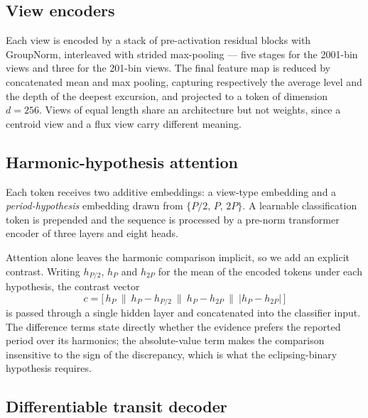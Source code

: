 \documentclass[preprint,12pt,authoryear]{elsarticle}
\begin{document}
\subsection{View encoders}

Each view is encoded by a stack of pre-activation residual blocks with
GroupNorm, interleaved with strided max-pooling --- five stages for the 2001-bin
views and three for the 201-bin views. The final feature map is reduced by
concatenated mean and max pooling, capturing respectively the average level and
the depth of the deepest excursion, and projected to a token of dimension
$d=256$. Views of equal length share an architecture but not weights, since a
centroid view and a flux view carry different meaning.

\subsection{Harmonic-hypothesis attention}
\label{sec:harmonic}

Each token receives two additive embeddings: a view-type embedding and a
\emph{period-hypothesis} embedding drawn from $\{P/2,\,P,\,2P\}$. A learnable
classification token is prepended and the sequence is processed by a
pre-norm transformer encoder \citep{Vaswani2017} of three layers and eight
heads.

Attention alone leaves the harmonic comparison implicit, so we add an explicit
contrast. Writing $h_{P/2}$, $h_{P}$ and $h_{2P}$ for the mean of the encoded
tokens under each hypothesis, the contrast vector
\begin{equation}
c = \big[\,h_{P}\ \|\ h_{P}-h_{P/2}\ \|\ h_{P}-h_{2P}\ \|\ |h_{P}-h_{2P}|\,\big]
\label{eq:contrast}
\end{equation}
is passed through a single hidden layer and concatenated into the classifier
input. The difference terms state directly whether the evidence prefers the
reported period over its harmonics; the absolute-value term makes the comparison
insensitive to the sign of the discrepancy, which is what the eclipsing-binary
hypothesis requires.

\subsection{Differentiable transit decoder}
\label{sec:decoder}
\end{document}
